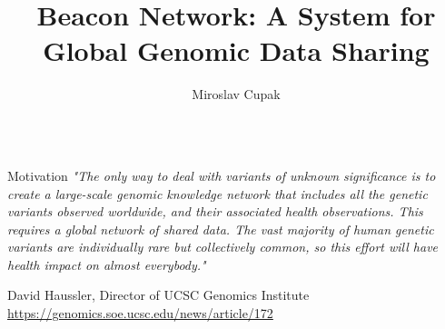 \documentclass{beamer}
\author[Advisor: Ing. Matej Lexa, Ph.D.]{Miroslav Cupak}
\title{Beacon Network: A System for Global Genomic Data Sharing}
\institute{Faculty of Informatics, Masaryk University, Brno, Czech Republic}
\begin{document}
\begin{frame}[fragile]

\begin{columns}[T]
\begin{column}{.32\textwidth}

\begin{block}{Motivation \hfill{}}
\textit{"The only way to deal with variants of unknown significance is to create a large-scale genomic knowledge network that includes all the genetic variants observed worldwide, and their associated health observations. This requires a global network of shared data. The vast majority of human genetic variants are individually rare but collectively common, so this effort will have health impact on almost everybody."}
\begin{flushright}
David Haussler, Director of UCSC Genomics Institute
\\\footnotesize \url{https://genomics.soe.ucsc.edu/news/article/172}
\end{flushright}
\vspace{-2mm}


\end{block}
\end{column}
\end{columns}
\end{frame}
\end{document}
